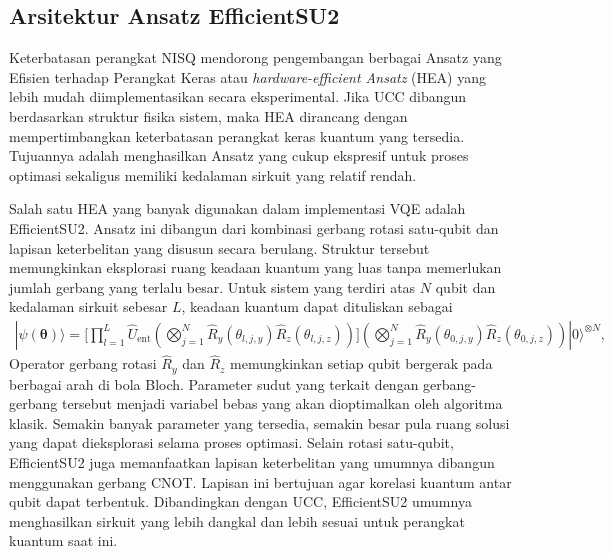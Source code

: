 \subsection{Arsitektur Ansatz EfficientSU2}
Keterbatasan perangkat NISQ mendorong pengembangan berbagai Ansatz yang Efisien terhadap Perangkat Keras atau \textit{hardware-efficient Ansatz} (HEA) yang lebih mudah diimplementasikan secara eksperimental. Jika UCC dibangun berdasarkan struktur fisika sistem, maka HEA dirancang dengan mempertimbangkan keterbatasan perangkat keras kuantum yang tersedia. Tujuannya adalah menghasilkan Ansatz yang cukup ekspresif untuk proses optimasi sekaligus memiliki kedalaman sirkuit yang relatif rendah.

Salah satu HEA yang banyak digunakan dalam implementasi VQE adalah EfficientSU2. Ansatz ini dibangun dari kombinasi gerbang rotasi satu-qubit dan lapisan keterbelitan yang disusun secara berulang. Struktur tersebut memungkinkan eksplorasi ruang keadaan kuantum yang luas tanpa memerlukan jumlah gerbang yang terlalu besar. Untuk sistem yang terdiri atas $N$ qubit dan kedalaman sirkuit sebesar $L$, keadaan kuantum dapat dituliskan sebagai
\begin{equation}
\begin{split}
|\psi(\boldsymbol{\theta})\rangle
=
\Bigg[
\prod_{l=1}^{L}
\hat U_{\mathrm{ent}}
\left(
\bigotimes_{j=1}^{N}
\hat R_y(\theta_{l,j,y})
\hat R_z(\theta_{l,j,z})
\right)
\Bigg]
\left(
\bigotimes_{j=1}^{N}
\hat R_y(\theta_{0,j,y})
\hat R_z(\theta_{0,j,z})
\right)
|0\rangle^{\otimes N},
\end{split}
\end{equation}
Operator gerbang rotasi $\hat{R}_y$ dan $\hat{R}_z$ memungkinkan setiap qubit bergerak pada berbagai arah di bola Bloch. Parameter sudut yang terkait dengan gerbang-gerbang tersebut menjadi variabel bebas yang akan dioptimalkan oleh algoritma klasik. Semakin banyak parameter yang tersedia, semakin besar pula ruang solusi yang dapat dieksplorasi selama proses optimasi. Selain rotasi satu-qubit, EfficientSU2 juga memanfaatkan lapisan keterbelitan yang umumnya dibangun menggunakan gerbang CNOT. Lapisan ini bertujuan agar korelasi kuantum antar qubit dapat terbentuk. Dibandingkan dengan UCC, EfficientSU2 umumnya menghasilkan sirkuit yang lebih dangkal dan lebih sesuai untuk perangkat kuantum saat ini.